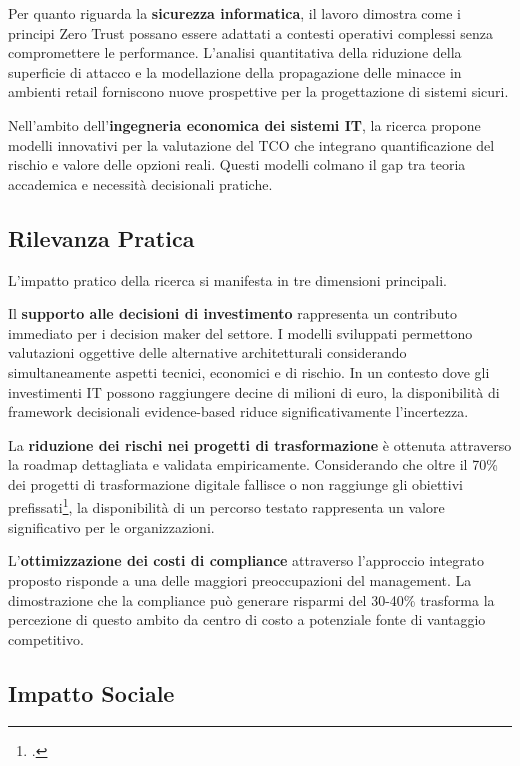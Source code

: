 Per quanto riguarda la \textbf{sicurezza informatica}, il lavoro dimostra come i principi Zero Trust possano essere adattati a contesti operativi complessi senza compromettere le performance. L'analisi quantitativa della riduzione della superficie di attacco e la modellazione della propagazione delle minacce in ambienti retail forniscono nuove prospettive per la progettazione di sistemi sicuri.

Nell'ambito dell'\textbf{ingegneria economica dei sistemi IT}, la ricerca propone modelli innovativi per la valutazione del TCO che integrano quantificazione del rischio e valore delle opzioni reali. Questi modelli colmano il gap tra teoria accademica e necessità decisionali pratiche.

\subsection{Rilevanza Pratica}

L'impatto pratico della ricerca si manifesta in tre dimensioni principali.

Il \textbf{supporto alle decisioni di investimento} rappresenta un contributo immediato per i decision maker del settore. I modelli sviluppati permettono valutazioni oggettive delle alternative architetturali considerando simultaneamente aspetti tecnici, economici e di rischio. In un contesto dove gli investimenti IT possono raggiungere decine di milioni di euro, la disponibilità di framework decisionali evidence-based riduce significativamente l'incertezza.

La \textbf{riduzione dei rischi nei progetti di trasformazione} è ottenuta attraverso la roadmap dettagliata e validata empiricamente. Considerando che oltre il 70\% dei progetti di trasformazione digitale fallisce o non raggiunge gli obiettivi prefissati\footcite{mckinsey2023}, la disponibilità di un percorso testato rappresenta un valore significativo per le organizzazioni.

L'\textbf{ottimizzazione dei costi di compliance} attraverso l'approccio integrato proposto risponde a una delle maggiori preoccupazioni del management. La dimostrazione che la compliance può generare risparmi del 30-40\% trasforma la percezione di questo ambito da centro di costo a potenziale fonte di vantaggio competitivo.

\subsection{Impatto Sociale}

